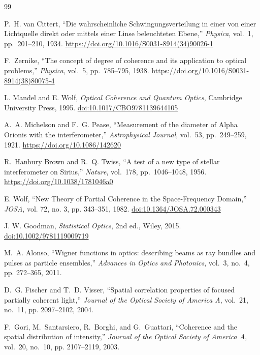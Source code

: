 \documentclass[a4paper,12pt]{article}
\begin{document}
\begin{thebibliography}{99}

P.~H. van Cittert, ``Die wahrscheinliche Schwingungsverteilung in einer von einer Lichtquelle direkt oder mittels einer Linse beleuchteten Ebene,'' \emph{Physica}, vol.~1, pp.~201--210, 1934. \url{https://doi.org/10.1016/S0031-8914(34)90026-1}

F.~Zernike, ``The concept of degree of coherence and its application to optical problems,'' \emph{Physica}, vol.~5, pp.~785--795, 1938. \url{https://doi.org/10.1016/S0031-8914(38)80075-4}

L. Mandel and E. Wolf,
\textit{Optical Coherence and Quantum Optics},
Cambridge University Press, 1995.
\href{https://doi.org/10.1017/CBO9781139644105}{doi:10.1017/CBO9781139644105}

A.~A. Michelson and F.~G. Pease, ``Measurement of the diameter of Alpha Orionis with the interferometer,'' \emph{Astrophysical Journal}, vol.~53, pp.~249--259, 1921. \url{https://doi.org/10.1086/142620}

R.~Hanbury Brown and R.~Q. Twiss, ``A test of a new type of stellar interferometer on Sirius,'' \emph{Nature}, vol.~178, pp.~1046--1048, 1956. \url{https://doi.org/10.1038/1781046a0}

E. Wolf,
``New Theory of Partial Coherence in the Space-Frequency Domain,''
\textit{JOSA}, vol. 72, no. 3, pp. 343--351, 1982.
\href{https://doi.org/10.1364/JOSA.72.000343}{doi:10.1364/JOSA.72.000343}

J. W. Goodman,
\textit{Statistical Optics}, 2nd ed.,
Wiley, 2015.
\href{https://doi.org/10.1002/9781119009719}{doi:10.1002/9781119009719}

M.~A. Alonso, ``Wigner functions in optics: describing beams as ray bundles and pulses as particle ensembles,'' \emph{Advances in Optics and Photonics}, vol.~3, no.~4, pp. 272--365, 2011.

D.~G. Fischer and T.~D. Visser, ``Spatial correlation properties of focused partially coherent light,'' \emph{Journal of the Optical Society of America A}, vol.~21, no.~11, pp. 2097--2102, 2004.

F.~Gori, M.~Santarsiero, R.~Borghi, and G.~Guattari, ``Coherence and the spatial distribution of intensity,'' \emph{Journal of the Optical Society of America A}, vol.~20, no.~10, pp. 2107--2119, 2003.


\end{thebibliography}
\end{document}
